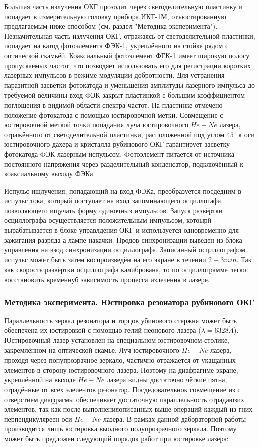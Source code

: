 \documentclass[a4paper,14pt,russian]{article}
\renewcommand{\AA}{\ensuremath{\mathring{A}}}
\begin{document}
Большая часть излучения ОКГ прозодит через светоделительную пластинку и попадает в измерительную головку прибора ИКТ-1М, отъюстированную предлагаемым ниже способом (см. раздел "Методика эксперимента"). Незначительная часть излучения ОКГ, отражаясь от светоделительной пластинки, попадает на катод фотоэлемента ФЭК-1, укреплённого на стойке рядом с оптической скамьёй. Коаксиальный фотоэлемент ФЕК-1 имеет широкую полосу пропускаемых частот, что позводяет использовать его для регистрации коротких лазерных импульсов в режиме модуляции добротности. Для устранения паразитной засветки фотокатода и уменьшения амплитуды лазерного импульса до требуемой величины вход ФЭК закрыт пластинкой с большим коэффициентом поглощения в видимой области спектра частот. На пластинке отмечено положение фотокатода с помощью юстировочной метки. Совмещение с юстировочной меткой точки попадания луча юстировочного $He-Ne$ лазера, отражённого от светоделительной пластинки, расположенной под углом $45 ^\circ$ к оси юстировочного дахера и кристалла рубинового ОКГ гарантирует засветку фотокатода ФЭК лазерным испульсом. Фотоэлемент питается от источника постоянного напряжения через разделительный конденсатор, подключённый к коаксиальному выходу ФЭКа.

Испульс ищлучения, попадающий на вход ФЭКа, преобразуется посдедним в испульс тока, который поступает на вход запоминающего осциллогафа, позволяющего ищучать форму одиночныз импульсов. Запуск развёртки осциллографа осуществляется положительным импульсом, котоырй вырабатывается в блоке управлдения ОКГ и используется одновременно для зажигания разряда а лампе накачки. Продов синхронизации выведен из блока управления на взод синхронизации осциллографа. Записанный осциллографом испульс может быть затем воспроизведён на его экране в течении $2-3 min$. Так как скорость развёртки осциллографа калибрована, то по осциллограмме легко восстановить временнуб зависимость процесса излечения в лазере.

\subsubsection{Методика эксперимента. Юстировка резонатора рубинового ОКГ}

Параллельность зеркал резонатора и торцов убинового стержня может быть обеспечена их юстировкой с помощью гелий-неонового лазера ($\lambda = 6328 \AA$). Юстировочный лазер установлен на специальном юстировочном столике, закремлённом на оптической скамье. Луч юстировочного $He-Ne$ лазера, проходя через попупрозрачное зеркало, частично отражается от укащанных элементов в сторону юстировочного лазера. Поэтому на диафрагнме-экране, укреплённой на выходе $He-Ne$ лазера видны достаточно чёткие пятна, отрадённые от всех элеиентов резонатор. Посдедовательнок совмещение из с отверстием диафрагмы обеспечивает достаточную параллельность отрадаюзих элементов, так как после выполненияописанных выше операций каждый из гних перпендикуляреен оси $He-Ne$ лазера. В рамках данной дабораторной работы производится лишь юстировка выодного полупрозрачного зеркала. Поэтому может быть предложен следующий порядок работ при юстирокке лазера:
\end{document}
